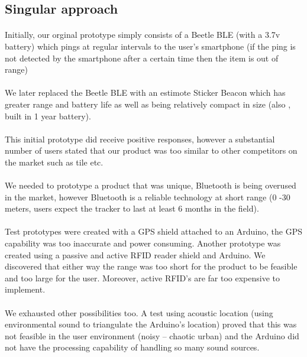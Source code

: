 \documentclass[12pt,a4paper]{article}
\begin{document}
      \subsection{Singular approach}
        \paragraph{}
          Initially, our orginal prototype simply consists of a Beetle BLE\cite{BlunoBeetle} (with a 3.7v battery) which pings at regular intervals to the user’s smartphone (if the ping is not detected by the smartphone after a certain time then the item is out of range)
        \paragraph{}
          We later replaced the Beetle BLE with an estimote Sticker Beacon\cite{Estimote} which has greater range and battery life as well as being relatively compact in size (also , built in 1 year battery).
        \paragraph{}
          This initial prototype did receive positive responses, however a substantial number of users stated that our product was too similar to other competitors on the market such as tile\cite{FindYourTile} etc.
        \paragraph{}
          We needed to prototype a product that was unique, Bluetooth is being overused in the market, however Bluetooth is a reliable technology at short range (0 -30 meters, users expect the tracker to last at least 6 months in the field).
        \paragraph{}
          Test prototypes were created with a GPS shield attached to an Arduino, the GPS capability was too inaccurate and power consuming. Another prototype was created using a passive and active RFID reader shield and Arduino. We discovered that either way the range was too short for the product to be feasible and too large for the user. Moreover, active RFID's are far too expensive to implement.
        \paragraph{}
          We exhausted other possibilities too. A test using acoustic location (using environmental sound to triangulate the Arduino’s location) proved that this was not feasible in the user environment (noisy – chaotic urban) and the Arduino did not have the processing capability of handling so many sound sources.
\end{document}
